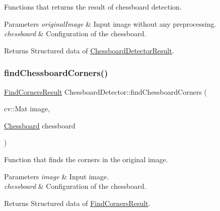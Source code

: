 Functions that returns the result of chessboard detection. 


\begin{DoxyParams}{Parameters}
{\em original\+Image} & Input image without any preprocessing. \\
\hline
{\em chessboard} & Configuration of the chessboard. \\
\hline
\end{DoxyParams}
\begin{DoxyReturn}{Returns}
Structured data of \hyperlink{struct_chessboard_detector_result}{Chessboard\+Detector\+Result}. 
\end{DoxyReturn}
\mbox{\label{class_chessboard_detector_a4d0df2c6479f32286935577e1b0fca41}} 
\subsubsection{\texorpdfstring{find\+Chessboard\+Corners()}{findChessboardCorners()}}
{\footnotesize\ttfamily \hyperlink{struct_find_corners_result}{Find\+Corners\+Result} Chessboard\+Detector\+::find\+Chessboard\+Corners (\begin{DoxyParamCaption}\item[{cv\+::\+Mat}]{image,  }\item[{\hyperlink{class_chessboard}{Chessboard}}]{chessboard }\end{DoxyParamCaption})}



Function that finds the corners in the original image. 


\begin{DoxyParams}{Parameters}
{\em image} & Input image. \\
\hline
{\em chessboard} & Configuration of the chessboard. \\
\hline
\end{DoxyParams}
\begin{DoxyReturn}{Returns}
Structured data of \hyperlink{struct_find_corners_result}{Find\+Corners\+Result}. 
\end{DoxyReturn}
\mbox{\label{class_chessboard_detector_a7f8fd52d9bb23984c0db1c4115e75043}} 
